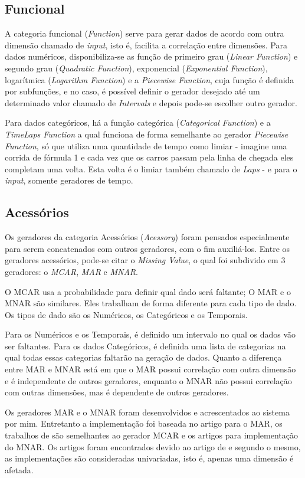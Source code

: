 \documentclass[
	12pt,				%
	openright,			%
	twoside,			%
	a4paper,			%
	english,			%
	brazil				%
	]{abntex2}
\begin{document}
		\subsection{Funcional}
			A categoria funcional (\emph{Function}) serve para gerar dados de acordo com outra dimensão chamado de \emph{input}, isto é, facilita a correlação entre dimensões.
			Para dados numéricos, disponibiliza-se as 
				função de primeiro grau (\emph{Linear Function}) e 
				segundo grau (\emph{Quadratic Function}), 
				exponencial (\emph{Exponential Function}), 
				logarítmica (\emph{Logarithm Function}) e
				a \emph{Piecewise Function}, cuja função é definida por subfunções, e no caso, é possível definir o gerador desejado até um determinado valor chamado de \emph{Intervals} e depois pode-se escolher outro gerador.
			\par
			Para dados categóricos, há a função categórica (\emph{Categorical Function}) e 
			a \emph{TimeLaps Function} a qual funciona de forma semelhante ao gerador \emph{Piecewise Function}, só que utiliza uma quantidade de tempo como limiar - imagine uma corrida de fórmula 1 e cada vez que os carros passam pela linha de chegada eles completam uma volta. Esta volta é o limiar também chamado de \emph{Laps} - e para o \emph{input}, somente geradores de tempo.
		\subsection{Acessórios}
			Os geradores da categoria Acessórios (\emph{Acessory}) foram pensados especialmente para serem concatenados com outros geradores, com o fim auxiliá-los.
			Entre os geradores acessórios, pode-se citar o \emph{Missing Value}, o qual foi subdivido em 3 geradores: o \emph{MCAR}, \emph{MAR} e \emph{MNAR}.
			\par
			O MCAR usa a probabilidade para definir qual dado será faltante;
			O MAR e o MNAR são similares. 
			Eles trabalham de forma diferente para cada tipo de dado.
			Os tipos de dado são os Numéricos, os Categóricos e os Temporais.
			\par
			Para os Numéricos e os Temporais, é definido um intervalo no qual os dados vão ser faltantes.
			Para os dados Categóricos, é definida uma lista de categorias na qual todas essas categorias faltarão na geração de dados.
			Quanto a diferença entre MAR e MNAR está em que o MAR possui correlação com outra dimensão e é independente de outros geradores,
			 enquanto o MNAR não possui correlação com outras dimensões, mas é dependente de outros geradores.
			\par
			 Os geradores MAR e o MNAR foram desenvolvidos e acrescentados ao sistema por mim.
			 Entretanto a implementação foi baseada no artigo \cite{rieger2010random} para o MAR,
			 os trabalhos de \cite{rieger2010random} \cite{xia2017adjusted} são semelhantes ao gerador MCAR e os artigos \cite{twala2009empirical} \cite{xia2017adjusted} para implementação do MNAR.
			 Os artigos foram encontrados devido ao artigo de \cite{santos2019generating} e segundo o mesmo, as implementações são consideradas univariadas, isto é, apenas uma dimensão é afetada.
			  
\end{document}
